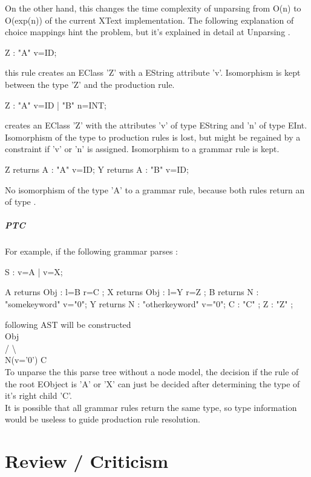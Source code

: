 On the other hand, this changes the time complexity of unparsing from O(n) to O(exp(n)) of the current XText implementation. The following explanation of choice mappings hint the problem, but it's explained in detail at Unparsing .
\begin{xtxt}
Z 	:  "A" v=ID;
\end{xtxt}
this rule creates an EClass 'Z' with a EString attribute 'v'. Isomorphism is kept between the type 'Z' and the production rule.
\begin{xtxt}
Z 	:  "A" v=ID  
	|  "B" n=INT;
	\end{xtxt}
creates an EClass 'Z' with the attributes 'v' of type EString and 'n' of type EInt.  Isomorphism of the type to production rules is lost, but might be regained by a constraint if 'v' or 'n' is assigned. Isomorphism to a grammar rule is kept.
\begin{xtxt}
Z returns A : "A" v=ID;
Y returns A : "B" v=ID;
\end{xtxt}
No isomorphism of the type 'A' to a grammar rule, because both rules return an  of type .

\subparagraph{PTC}

For example, if the following grammar parses :
\begin{xtxt}
S  	:  	v=A 
	| 	v=X;

A returns Obj	: 	l=B r=C   ;
X returns Obj	: 	l=Y r=Z   ;
B returns N  	:  	"somekeyword" 	v="0";
Y returns N  	: 	"otherkeyword" 	v="0";
C 		:  	 "C" ;
Z 		: 	 "Z" ;
\end{xtxt}
following AST will be constructed  \\ 
      Obj			\\
     /   \textbackslash		\\
N(v='0')   C	\\
To unparse the this parse tree without a node model, the decision if the rule of the root EObject is 'A' or 'X' can just be decided after determining the type of it's right child 'C'. \\

It is possible that all grammar rules return the same type, so type information would be useless to guide production rule resolution.\\





\section{Review / Criticism}
